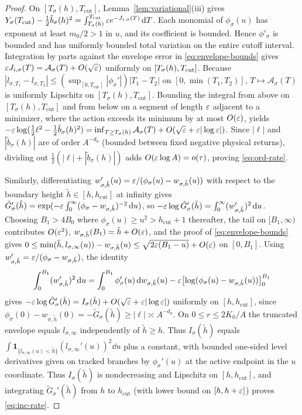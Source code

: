 \begin{proof}
On $[T_\sigma(h),T_{\mathrm{cut}}]$, Lemma~\ref{lem:variational}(iii) gives
$Y_\sigma(T_{\mathrm{cut}})-\frac{1}{2}\tilde{b}_\sigma(h)^2 = \int_{T_\sigma(h)}^{T_{\mathrm{cut}}}
\varepsilon e^{-J_{i,\sigma}(T)}\,\mathrm{d} T$. Each monomial of $\phi_\sigma(u)$ has exponent at least $m_0/2>1$
in $u$, and its coefficient is bounded. Hence $\phi'_\sigma$ is bounded
and has uniformly bounded total variation on the entire cutoff interval.
Integration by parts against the envelope error in
\eqref{eq:envelope-bounds} gives $\varepsilon J_{i,\sigma}(T)=
\mathcal A_\sigma(T)+O(\sqrt{\varepsilon})$ uniformly on
$[T_\sigma(h),T_{\rm cut}]$.
Because $|l_{\sigma,T_1}-l_{\sigma,T_2}|\le (\sup_{[0,T_{\mathrm{cut}}]}|\phi_\sigma'|)|T_1-T_2|$ on
$[0,\min(T_1,T_2)]$, $T\mapsto\mathcal{A}_\sigma(T)$ is uniformly Lipschitz on
$[T_\sigma(h),T_{\mathrm{cut}}]$. Bounding the integral from above on $[T_\sigma(h),T_{\mathrm{cut}}]$
and from below on a segment of length $\varepsilon$ adjacent to a minimizer,
where the action exceeds its minimum by at most $O(\varepsilon)$, yields
$-\varepsilon\log(\frac{1}{2}\ell^2-\frac{1}{2}\tilde{b}_\sigma(h)^2)=\inf_{T\ge
T_\sigma(h)}\mathcal{A}_\sigma(T)+O(\sqrt{\varepsilon}+\varepsilon|\log\varepsilon|)$. Since $|\ell|$ and
$|\tilde{b}_\sigma(h)|$ are of order $A^{-d_0}$ (bounded between fixed negative physical returns),
dividing out $\frac{1}{2}(|\ell|+|\tilde{b}_\sigma(h)|)$ adds $O(\varepsilon\log A)=o(\tau)$, proving
\eqref{eq:ord-rate}.

Similarly, differentiating $w_{\sigma,\tilde{h}}'(u)=\varepsilon/(\phi_\sigma(u)-w_{\sigma,\tilde{h}}(u))$
with respect to the boundary height $\tilde{h}\in[h,h_{\mathrm{cut}}]$ at infinity gives
$\tilde{G}_\sigma'(\tilde{h})=\exp(-\varepsilon\int_0^\infty(\phi_\sigma-w_{\sigma,\tilde{h}})^{-2}\,\mathrm{d} u)$,
so $-\varepsilon\log\tilde{G}_\sigma'(\tilde{h})=\int_0^\infty (w_{\sigma,\tilde{h}}')^2\,\mathrm{d} u$. Choosing
$B_1>4B_0$ where $\phi_\sigma(u)\ge u^2>h_{\mathrm{cut}}+1$ thereafter, the tail on $[B_1,\infty)$
contributes $O(\varepsilon^2)$, $w_{\sigma,\tilde{h}}(B_1)=\tilde{h}+O(\varepsilon)$, and the proof of
\eqref{eq:envelope-bounds} gives $0\le
\min(\tilde{h},l_{\sigma,\infty}(u))-w_{\sigma,\tilde{h}}(u)\le\sqrt{2\varepsilon(B_1-u)}+O(\varepsilon)$ on
$[0,B_1]$. Using $w_{\sigma,\tilde{h}}'=\varepsilon/(\phi_\sigma-w_{\sigma,\tilde{h}})$, the identity
\[
  \int_0^{B_1} (w_{\sigma,\tilde{h}}')^2\,\mathrm{d} u = \int_0^{B_1} \phi_\sigma'(u)\,\mathrm{d}
  w_{\sigma,\tilde{h}}(u) - \varepsilon\bigl[\log(\phi_\sigma(u)-w_{\sigma,\tilde{h}}(u))\bigr]_0^{B_1}
\]
gives $-\varepsilon\log\tilde{G}_\sigma'(\tilde{h})=I_\sigma(\tilde{h})+O(\sqrt{\varepsilon}+\varepsilon|\log\varepsilon|)$
uniformly on $[h,h_{\mathrm{cut}}]$, since
$\phi_\sigma(0)-w_{\sigma,\tilde{h}}(0)=-\tilde{G}_\sigma(\tilde{h})\ge |\ell|\asymp A^{-d_0}$. On
$0\le r\le 2K_0/A$ the truncated envelope equals $l_{\sigma,\infty}$ independently of $\tilde h\ge h$.
Thus $I_\sigma(\tilde{h})$ equals $\int
\mathbf{1}_{\{l_{\sigma,\infty}(u)<\tilde{h}\}}(l_{\sigma,\infty}'(u))^2\dd u$ plus a constant, with
bounded one-sided level derivatives given on tracked branches by $\phi_\sigma'(u)$ at the active
endpoint in the $u$ coordinate. Thus $I_\sigma(\tilde{h})$ is nondecreasing and Lipschitz on
$[h,h_{\mathrm{cut}}]$, and integrating $\tilde{G}_\sigma'(\tilde{h})$ from $h$ to $h_{\mathrm{cut}}$
(with lower bound on $[h,h+\varepsilon]$) proves \eqref{eq:inc-rate}.


\end{proof}
